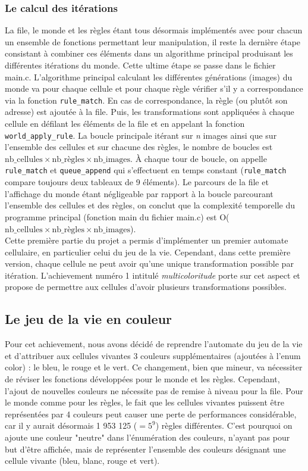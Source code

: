 \documentclass[a4paper]{article}
\begin{document}
\subsubsection{Le calcul des itérations}
La file, le monde et les règles étant tous désormais implémentés avec pour chacun un ensemble de fonctions permettant leur manipulation, il reste la dernière étape consistant à combiner ces éléments dans un algorithme principal produisant les différentes itérations du monde. Cette ultime étape se passe dans le fichier main.c. L'algorithme principal calculant les différentes générations (images) du monde va pour chaque cellule et pour chaque règle vérifier s'il y a correspondance via la fonction \texttt{rule\_match}. En cas de correspondance, la règle (ou plutôt son adresse) est ajoutée à la file. Puis, les transformations sont appliquées à chaque cellule en défilant les éléments de la file et en appelant la fonction \texttt{world\_apply\_rule}. La boucle principale itérant sur \emph{n} images ainsi que sur l'ensemble des cellules et sur chacune des règles, le nombre de boucles est \(\text{nb\_cellules} \times \text{nb\_règles} \times \text{nb\_images}\). À chaque tour de boucle, on appelle \texttt{rule\_match} et \texttt{queue\_append} qui s'effectuent en temps constant (\texttt{rule\_match} compare toujours deux tableaux de 9 éléments). Le parcours de la file et l'affichage du monde étant  négligeable par rapport à la boucle parcourant l'ensemble des cellules et des règles, on conclut que la complexité temporelle du programme principal (fonction main du fichier main.c) est O(\(\text{nb\_cellules} \times \text{nb\_règles} \times \text{nb\_images}\)).
\\
\indent Cette première partie du projet a permis d'implémenter un premier automate cellulaire, en particulier celui du jeu de la vie. Cependant, dans cette première version, chaque cellule ne peut avoir qu'une unique transformation possible par itération. L'achievement numéro 1 intitulé \emph{multicoloritude} porte sur cet aspect et propose de permettre aux cellules d'avoir plusieurs transformations possibles.

\subsection{Le jeu de la vie en couleur}
Pour cet achievement, nous avons décidé de reprendre l'automate du jeu de la vie et d'attribuer aux cellules vivantes 3 couleurs supplémentaires (ajoutées à l'enum color) : le bleu, le rouge et le vert. Ce changement, bien que mineur, va nécessiter de réviser les fonctions développées pour le monde et les règles. Cependant, l'ajout de nouvelles couleurs ne nécessite pas de remise à niveau pour la file.
Pour le monde comme pour les règles, le fait que les cellules vivantes puissent être représentées par 4 couleurs peut causer une perte de performances considérable, car il y aurait désormais 1 953 125 (\(= 5^9\)) règles différentes. C'est pourquoi on ajoute une couleur "neutre" dans l'énumération des couleurs, n'ayant pas pour but d'être affichée, mais de représenter l'ensemble des couleurs désignant une cellule vivante (bleu, blanc, rouge et vert).
\end{document}

